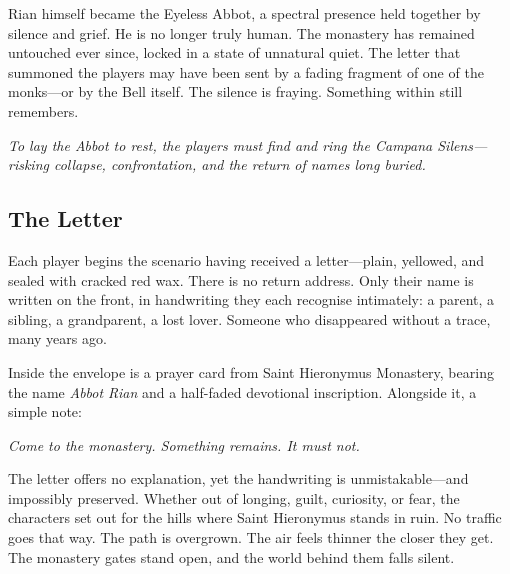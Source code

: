 Rian himself became the Eyeless Abbot, a spectral presence held together by silence and grief. He is no longer truly human. The monastery has remained untouched ever since, locked in a state of unnatural quiet. The letter that summoned the players may have been sent by a fading fragment of one of the monks—or by the Bell itself. The silence is fraying. Something within still remembers.

\vspace{\baselineskip}
\emph{To lay the Abbot to rest, the players must find and ring the Campana Silens—risking collapse, confrontation, and the return of names long buried.}


\newcolumn
\subsection*{The Letter}

Each player begins the scenario having received a letter—plain, yellowed, and sealed with cracked red wax. There is no return address. Only their name is written on the front, in handwriting they each recognise intimately: a parent, a sibling, a grandparent, a lost lover. Someone who disappeared without a trace, many years ago.

Inside the envelope is a prayer card from Saint Hieronymus Monastery, bearing the name \emph{Abbot Rian} and a half-faded devotional inscription. Alongside it, a simple note:

\begin{Example}{}
   \textit{Come to the monastery. Something remains. It must not.}
\end{Example}

    
The letter offers no explanation, yet the handwriting is unmistakable—and impossibly preserved. Whether out of longing, guilt, curiosity, or fear, the characters set out for the hills where Saint Hieronymus stands in ruin. No traffic goes that way. The path is overgrown. The air feels thinner the closer they get. The monastery gates stand open, and the world behind them falls silent.

